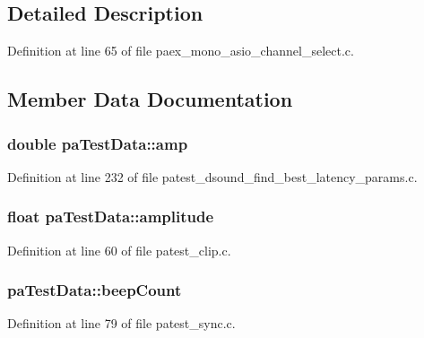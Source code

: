 \subsection{Detailed Description}


Definition at line 65 of file paex\+\_\+mono\+\_\+asio\+\_\+channel\+\_\+select.\+c.



\subsection{Member Data Documentation}
\subsubsection[{\texorpdfstring{amp}{amp}}]{\setlength{\rightskip}{0pt plus 5cm}double pa\+Test\+Data\+::amp}\hypertarget{structpa_test_data_a32fb3d8e9314d36eb5e3534d4a8319bf}{}\label{structpa_test_data_a32fb3d8e9314d36eb5e3534d4a8319bf}


Definition at line 232 of file patest\+\_\+dsound\+\_\+find\+\_\+best\+\_\+latency\+\_\+params.\+c.

\subsubsection[{\texorpdfstring{amplitude}{amplitude}}]{\setlength{\rightskip}{0pt plus 5cm}float pa\+Test\+Data\+::amplitude}\hypertarget{structpa_test_data_ad5cf5eb9b03e0b77bb4e10bfdad97f89}{}\label{structpa_test_data_ad5cf5eb9b03e0b77bb4e10bfdad97f89}


Definition at line 60 of file patest\+\_\+clip.\+c.

\subsubsection[{\texorpdfstring{beep\+Count}{beepCount}}]{ pa\+Test\+Data\+::beep\+Count}\hypertarget{structpa_test_data_a3fb4dd5ecce3971ae45e7044f6e08419}{}\label{structpa_test_data_a3fb4dd5ecce3971ae45e7044f6e08419}


Definition at line 79 of file patest\+\_\+sync.\+c.

